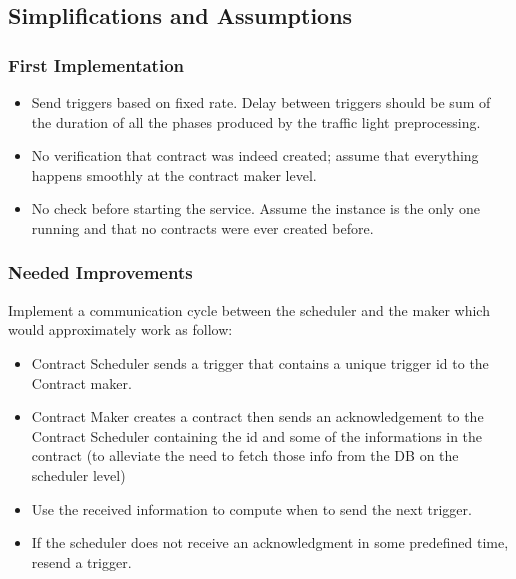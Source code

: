 \documentclass[letterpaper,10pt,english]{sphinxmanual}
\begin{document}
\subsection{Simplifications and Assumptions}
\label{\detokenize{microservices/contract_scheduler/simplification_and_assumptions:simplifications-and-assumptions}}\label{\detokenize{microservices/contract_scheduler/simplification_and_assumptions::doc}}

\subsubsection{First Implementation}
\label{\detokenize{microservices/contract_scheduler/simplification_and_assumptions:first-implementation}}\begin{itemize}
\item {} 
Send triggers based on fixed rate. Delay between triggers should be sum of the duration of all the phases produced by the traffic light preprocessing.

\item {} 
No verification that contract was indeed created; assume that everything happens smoothly at the contract maker level.

\item {} 
No check before starting the service. Assume the instance is the only one running and that no contracts were ever created before.

\end{itemize}


\subsubsection{Needed Improvements}
\label{\detokenize{microservices/contract_scheduler/simplification_and_assumptions:needed-improvements}}
Implement a communication cycle between the scheduler and the maker which would approximately work as follow:
\begin{itemize}
\item {} 
Contract Scheduler sends a trigger that contains a unique trigger id to the Contract maker.

\item {} 
Contract Maker creates a contract then sends an acknowledgement to the Contract Scheduler containing the id and some of the informations in the contract (to alleviate the need to fetch those info from the DB on the scheduler level)

\item {} 
Use the received information to compute when to send the next trigger.

\item {} 
If the scheduler does not receive an acknowledgment in some predefined time, resend a trigger.

\end{itemize}
\end{document}
